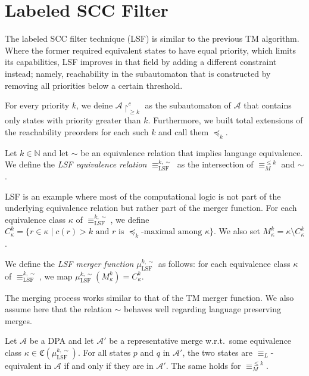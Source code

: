 \section{Labeled SCC Filter}
The labeled SCC filter technique (LSF) is similar to the previous TM algorithm. Where the former required equivalent states to have equal priority, which limits its capabilities, LSF improves in that field by adding a different constraint instead; namely, reachability in the subautomaton that is constructed by removing all priorities below a certain threshold.

For every priority $k$, we deine $\mathcal{A} \upharpoonright^c_{\geq k}$ as the subautomaton of $\mathcal{A}$ that contains only states with priority greater than $k$. Furthermore, we built total extensions of the reachability preorders for each such $k$ and call them $\preceq_k$.

\begin{definition}
	Let $k \in \mathbb{N}$ and let $\sim$ be an equivalence relation that implies language equivalence. We define the \emph{LSF equivalence relation} $\equiv_\text{LSF}^{k,\sim}$ as the intersection of $\equiv_M^{\leq k}$ and $\sim$.
\end{definition}
	
LSF is an example where most of the computational logic is not part of the underlying equivalence relation but rather part of the merger function. For each equivalence class $\kappa$ of $\equiv_\text{LSF}^{k,\sim}$, we define $C_\kappa^k = \{r \in \kappa \mid c(r) > k \text{ and } r \text{ is } \preceq_k \text{-maximal among } \kappa\}$. We also set $M_\kappa^k = \kappa \setminus C_\kappa^k$.
	
\begin{definition}
	We define the \emph{LSF merger function} $\mu_\text{LSF}^{k,\sim}$ as follows: for each equivalence class $\kappa$ of $\equiv_\text{LSF}^{k,\sim}$, we map $\mu_\text{LSF}^{k,\sim}(M_\kappa^k) = C_\kappa^k$.
\end{definition}

The merging process works similar to that of the TM merger function. We also assume here that the relation $\sim$ behaves well regarding language preserving merges.

\begin{lemma}
	Let $\mathcal{A}$ be a DPA and let $\mathcal{A}'$ be a representative merge w.r.t.\ some equivalence class $\kappa \in \mathfrak{C}(\mu_\text{LSF}^{k,\sim})$. For all states $p$ and $q$ in $\mathcal{A}'$, the two states are $\equiv_L$-equivalent in $\mathcal{A}$ if and only if they are in $\mathcal{A}'$. The same holds for $\equiv_M^{\leq k}$.
	\label{lem:lsf_kappamerge}
\end{lemma}

